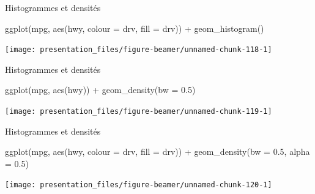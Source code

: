 \documentclass[12pt,handout,ignorenonframetext,]{beamer}
\newenvironment{Shaded}{}{}
\newcommand{\KeywordTok}[1]{\textcolor[rgb]{0.00,0.00,1.00}{{#1}}}
\newcommand{\DataTypeTok}[1]{{#1}}
\newcommand{\FloatTok}[1]{{#1}}
\newcommand{\StringTok}[1]{\textcolor[rgb]{0.00,0.50,0.50}{{#1}}}
\newcommand{\NormalTok}[1]{{#1}}
\renewenvironment{Shaded}{\begin{snugshade}}{\end{snugshade}}
\begin{document}
\begin{frame}[fragile]{Histogrammes et densités}

\footnotesize \center

\begin{Shaded}
\begin{Highlighting}[]
\KeywordTok{ggplot}\NormalTok{(mpg, }\KeywordTok{aes}\NormalTok{(hwy, }\DataTypeTok{colour =} \NormalTok{drv, }\DataTypeTok{fill =} \NormalTok{drv)) +}\StringTok{ }
\StringTok{  }\KeywordTok{geom_histogram}\NormalTok{()}
\end{Highlighting}
\end{Shaded}

\texttt{[image: presentation\_files/figure-beamer/unnamed-chunk-118-1]}

\end{frame}

\begin{frame}[fragile]{Histogrammes et densités}

\footnotesize \center

\begin{Shaded}
\begin{Highlighting}[]
\KeywordTok{ggplot}\NormalTok{(mpg, }\KeywordTok{aes}\NormalTok{(hwy)) +}\StringTok{ }\KeywordTok{geom_density}\NormalTok{(}\DataTypeTok{bw =} \FloatTok{0.5}\NormalTok{)}
\end{Highlighting}
\end{Shaded}

\texttt{[image: presentation\_files/figure-beamer/unnamed-chunk-119-1]}

\end{frame}

\begin{frame}[fragile]{Histogrammes et densités}

\footnotesize \center

\begin{Shaded}
\begin{Highlighting}[]
\KeywordTok{ggplot}\NormalTok{(mpg, }\KeywordTok{aes}\NormalTok{(hwy, }\DataTypeTok{colour =} \NormalTok{drv, }\DataTypeTok{fill =} \NormalTok{drv)) +}\StringTok{ }
\StringTok{  }\KeywordTok{geom_density}\NormalTok{(}\DataTypeTok{bw =} \FloatTok{0.5}\NormalTok{, }\DataTypeTok{alpha =} \FloatTok{0.5}\NormalTok{)}
\end{Highlighting}
\end{Shaded}

\texttt{[image: presentation\_files/figure-beamer/unnamed-chunk-120-1]}

\end{frame}
\end{document}
